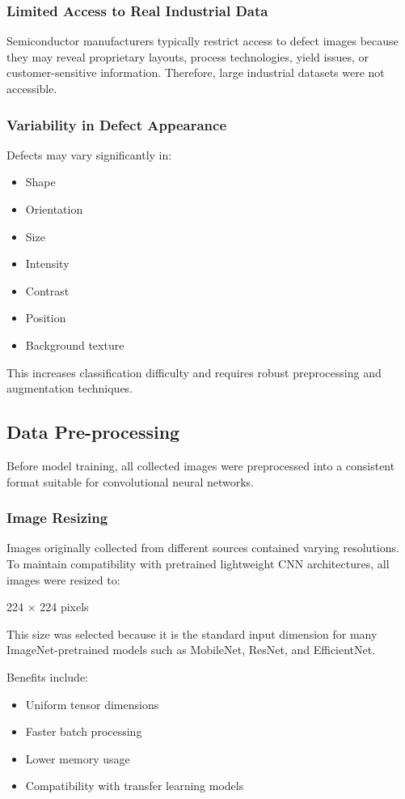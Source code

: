 \subsubsection{Limited Access to Real Industrial Data}

Semiconductor manufacturers typically restrict access to defect images because they may reveal proprietary layouts, process technologies, yield issues, or customer-sensitive information. Therefore, large industrial datasets were not accessible.

\subsubsection {Variability in Defect Appearance}

Defects may vary significantly in:
\begin{itemize}
\item Shape
\item Orientation
\item Size
\item Intensity
\item Contrast
\item Position
\item Background texture
\end{itemize}
This increases classification difficulty and requires robust preprocessing and augmentation techniques.

\subsection{Data Pre-processing}
Before model training, all collected images were preprocessed into a consistent format suitable for convolutional neural networks.

\subsubsection {Image Resizing}

Images originally collected from different sources contained varying resolutions. To maintain compatibility with pretrained lightweight CNN architectures, all images were resized to:

224 × 224 pixels

This size was selected because it is the standard input dimension for many ImageNet-pretrained models such as MobileNet, ResNet, and EfficientNet.

Benefits include:
\begin{itemize}
\item Uniform tensor dimensions
\item Faster batch processing
\item Lower memory usage
\item Compatibility with transfer learning models
\end{itemize}


